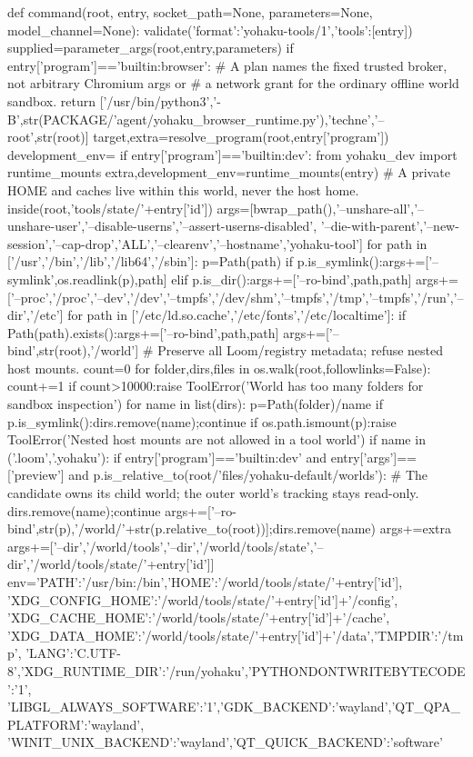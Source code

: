def command(root, entry, socket_path=None, parameters=None, model_channel=None):
    validate({'format':'yohaku-tools/1','tools':[entry]})
    supplied=parameter_args(root,entry,parameters)
    if entry['program']=='builtin:browser':
        # A plan names the fixed trusted broker, not arbitrary Chromium args or
        # a network grant for the ordinary offline world sandbox.
        return ['/usr/bin/python3','-B',str(PACKAGE/'agent/yohaku_browser_runtime.py'),'techne','--root',str(root)]
    target,extra=resolve_program(root,entry['program'])
    development_env={}
    if entry['program']=='builtin:dev':
        from yohaku_dev import runtime_mounts
        extra,development_env=runtime_mounts(entry)
    # A private HOME and caches live within this world, never the host home.
    inside(root,'tools/state/'+entry['id'])
    args=[bwrap_path(),'--unshare-all','--unshare-user','--disable-userns','--assert-userns-disabled',
          '--die-with-parent','--new-session','--cap-drop','ALL','--clearenv','--hostname','yohaku-tool']
    for path in ['/usr','/bin','/lib','/lib64','/sbin']:
        p=Path(path)
        if p.is_symlink():args+=['--symlink',os.readlink(p),path]
        elif p.is_dir():args+=['--ro-bind',path,path]
    args+=['--proc','/proc','--dev','/dev','--tmpfs','/dev/shm','--tmpfs','/tmp','--tmpfs','/run','--dir','/etc']
    for path in ['/etc/ld.so.cache','/etc/fonts','/etc/localtime']:
        if Path(path).exists():args+=['--ro-bind',path,path]
    args+=['--bind',str(root),'/world']
    # Preserve all Loom/registry metadata; refuse nested host mounts.
    count=0
    for folder,dirs,files in os.walk(root,followlinks=False):
        count+=1
        if count>10000:raise ToolError('World has too many folders for sandbox inspection')
        for name in list(dirs):
            p=Path(folder)/name
            if p.is_symlink():dirs.remove(name);continue
            if os.path.ismount(p):raise ToolError('Nested host mounts are not allowed in a tool world')
            if name in ('.loom','.yohaku'):
                if entry['program']=='builtin:dev' and entry['args']==['preview'] and p.is_relative_to(root/'files/yohaku-default/worlds'):
                    # The candidate owns its child world; the outer world's tracking stays read-only.
                    dirs.remove(name);continue
                args+=['--ro-bind',str(p),'/world/'+str(p.relative_to(root))];dirs.remove(name)
    args+=extra
    args+=['--dir','/world/tools','--dir','/world/tools/state','--dir','/world/tools/state/'+entry['id']]
    env={'PATH':'/usr/bin:/bin','HOME':'/world/tools/state/'+entry['id'],
         'XDG_CONFIG_HOME':'/world/tools/state/'+entry['id']+'/config',
         'XDG_CACHE_HOME':'/world/tools/state/'+entry['id']+'/cache',
         'XDG_DATA_HOME':'/world/tools/state/'+entry['id']+'/data','TMPDIR':'/tmp',
         'LANG':'C.UTF-8','XDG_RUNTIME_DIR':'/run/yohaku','PYTHONDONTWRITEBYTECODE':'1',
         'LIBGL_ALWAYS_SOFTWARE':'1','GDK_BACKEND':'wayland','QT_QPA_PLATFORM':'wayland',
         'WINIT_UNIX_BACKEND':'wayland','QT_QUICK_BACKEND':'software'}
